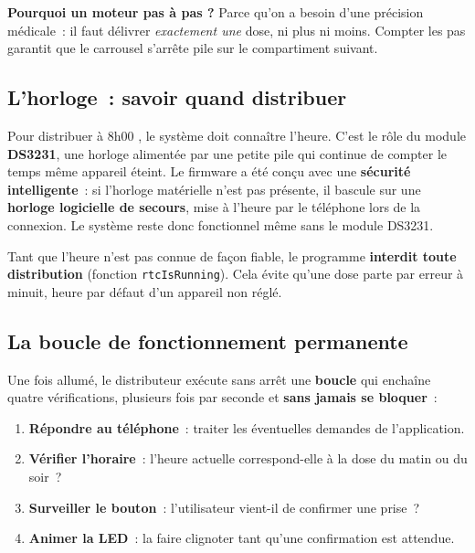\documentclass[11pt,a4paper]{report}
\begin{document}
\begin{infobox}
\textbf{Pourquoi un moteur \og pas \`a pas \fg ?} Parce qu'on a besoin d'une pr\'ecision
m\'edicale~: il faut d\'elivrer \emph{exactement une} dose, ni plus ni moins. Compter les
pas garantit que le carrousel s'arr\^ete pile sur le compartiment suivant.
\end{infobox}

\subsection{L'horloge~: savoir quand distribuer}

Pour distribuer \og \`a 8h00 \fg, le syst\`eme doit conna\^itre l'heure. C'est le r\^ole
du module \textbf{DS3231}, une horloge aliment\'ee par une petite pile qui continue de
compter le temps m\^eme appareil \'eteint. Le firmware a \'et\'e con\c cu avec une
\textbf{s\'ecurit\'e intelligente}~: si l'horloge mat\'erielle n'est pas pr\'esente, il
bascule sur une \textbf{horloge logicielle de secours}, mise \`a l'heure par le t\'el\'ephone
lors de la connexion. Le syst\`eme reste donc fonctionnel m\^eme sans le module DS3231.

\begin{infobox}
Tant que l'heure n'est pas connue de fa\c con fiable, le programme \textbf{interdit toute
distribution} (fonction \texttt{rtcIsRunning}). Cela \'evite qu'une dose parte par erreur
\`a minuit, heure par d\'efaut d'un appareil non r\'egl\'e.
\end{infobox}

\subsection{La boucle de fonctionnement permanente}

Une fois allum\'e, le distributeur ex\'ecute sans arr\^et une \textbf{boucle} qui
encha\^ine quatre v\'erifications, plusieurs fois par seconde et \textbf{sans jamais se
bloquer}~:

\begin{enumerate}
  \item \textbf{R\'epondre au t\'el\'ephone}~: traiter les \'eventuelles demandes de l'application.
  \item \textbf{V\'erifier l'horaire}~: l'heure actuelle correspond-elle \`a la dose du matin ou du soir~?
  \item \textbf{Surveiller le bouton}~: l'utilisateur vient-il de confirmer une prise~?
  \item \textbf{Animer la LED}~: la faire clignoter tant qu'une confirmation est attendue.
\end{enumerate}
\end{document}
